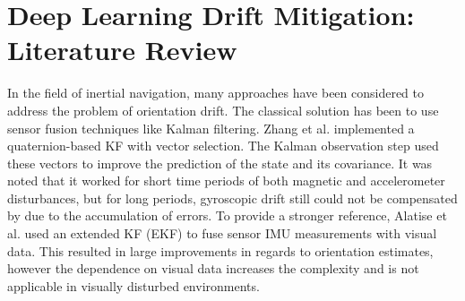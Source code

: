 \newpage
\section{Deep Learning Drift Mitigation: Literature Review}

In the field of inertial navigation, many approaches have been considered 
to address the problem of orientation drift. The classical solution has been
to use sensor fusion techniques like Kalman filtering. Zhang et
al.  implemented a quaternion-based KF 
with vector selection. The Kalman observation step used these vectors 
to improve the prediction of the state and its covariance. It was noted that
it worked for short time periods of both magnetic and accelerometer disturbances,
but for long periods, gyroscopic drift still could not be compensated by due to the accumulation of errors.
To provide a stronger reference, Alatise et al.  used an extended KF (EKF) to fuse sensor IMU measurements with
visual data. This resulted in large improvements in regards to orientation
estimates, however the dependence on visual data increases the complexity and
is not applicable in visually disturbed environments.   